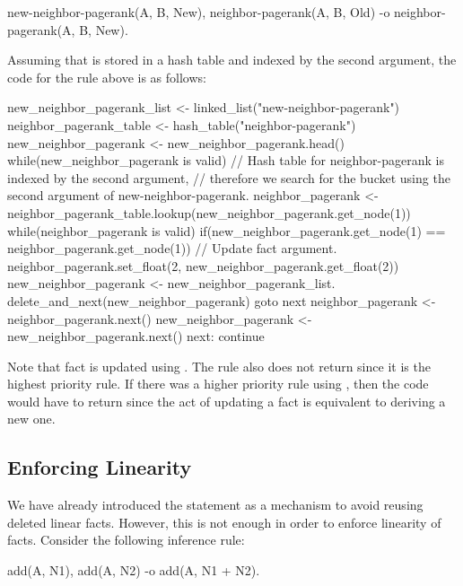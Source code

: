 \begin{Code}
new-neighbor-pagerank(A, B, New),
neighbor-pagerank(A, B, Old)
   -o neighbor-pagerank(A, B, New).
\end{Code}

Assuming that  is stored in a hash table and indexed by
the second argument, the code for the rule above is as follows:

\begin{LineCode}
new_neighbor_pagerank_list <- linked_list("new-neighbor-pagerank")
neighbor_pagerank_table <- hash_table("neighbor-pagerank")
new_neighbor_pagerank <- new_neighbor_pagerank.head()
while(new_neighbor_pagerank is valid)
{
   // Hash table for neighbor-pagerank is indexed by the second argument,
   // therefore we search for the bucket using the second argument of new-neighbor-pagerank.
   neighbor_pagerank <- neighbor_pagerank_table.lookup(new_neighbor_pagerank.get_node(1))
   while(neighbor_pagerank is valid)
   {
      if(new_neighbor_pagerank.get_node(1) == neighbor_pagerank.get_node(1))
      {
         // Update fact argument.
         neighbor_pagerank.set_float(2, new_neighbor_pagerank.get_float(2))
         new_neighbor_pagerank <- new_neighbor_pagerank_list.
                  delete_and_next(new_neighbor_pagerank)
         goto next
      }
      neighbor_pagerank <- neighbor_pagerank.next()
   }
   new_neighbor_pagerank <- new_neighbor_pagerank.next()
next:
   continue
}
\end{LineCode}

Note that  fact is updated using . The
rule also does not return since it is the highest priority rule. If there was a
higher priority rule using , then the code would have to
return since the act of updating a fact is equivalent to deriving a new one.

\subsection{Enforcing Linearity}

We have already introduced the  statement as a mechanism to avoid
reusing deleted linear facts. However, this is not enough in order to enforce
linearity of facts. Consider the following inference rule:

\begin{Code}
add(A, N1),
add(A, N2)
   -o add(A, N1 + N2).
\end{Code}

